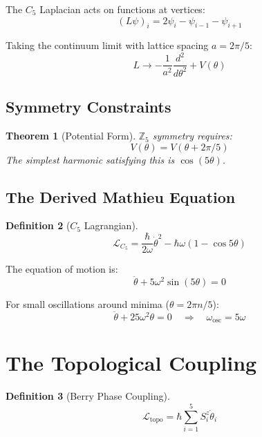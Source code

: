 \documentclass[11pt,a4paper]{article}
\newtheorem{theorem}{Theorem}[section]
\theoremstyle{definition}
\newtheorem{definition}[theorem]{Definition}
\newcommand{\LL}{\mathcal{L}}
\begin{document}
The $C_5$ Laplacian acts on functions at vertices:
\begin{equation}
(L\psi)_i = 2\psi_i - \psi_{i-1} - \psi_{i+1}
\end{equation}

Taking the continuum limit with lattice spacing $a = 2\pi/5$:
\begin{equation}
L \to -\frac{1}{a^2}\frac{d^2}{d\theta^2} + V(\theta)
\end{equation}

\subsection{Symmetry Constraints}

\begin{theorem}[Potential Form]
$\mathbb{Z}_5$ symmetry requires:
\begin{equation}
V(\theta) = V(\theta + 2\pi/5)
\end{equation}
The simplest harmonic satisfying this is $\cos(5\theta)$.
\end{theorem}

\subsection{The Derived Mathieu Equation}

\begin{definition}[$C_5$ Lagrangian]
\begin{equation}
\LL_{C_5} = \frac{\hbar}{2\omega}\dot{\theta}^2 - \hbar\omega(1 - \cos 5\theta)
\end{equation}
\end{definition}

The equation of motion is:
\begin{equation}
\ddot{\theta} + 5\omega^2 \sin(5\theta) = 0
\end{equation}

For small oscillations around minima ($\theta = 2\pi n/5$):
\begin{equation}
\ddot{\theta} + 25\omega^2 \theta = 0 \quad \Rightarrow \quad \omega_{\text{osc}} = 5\omega
\end{equation}

\section{The Topological Coupling}

\begin{definition}[Berry Phase Coupling]
\begin{equation}
\LL_{\text{topo}} = \hbar \sum_{i=1}^{5} S_i^z \dot{\theta}_i
\end{equation}
\end{definition}
\end{document}
